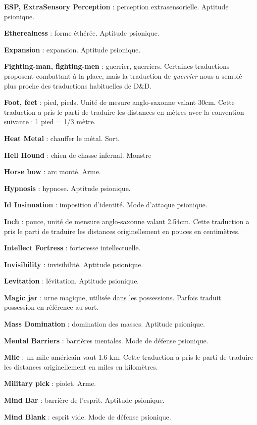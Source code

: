 \documentclass[11pt]{article}
\begin{document}
{\textbf{ESP, ExtraSensory Perception} : perception extrasensorielle. Aptitude psionique.

\textbf{Etherealness} : forme éthérée. Aptitude psionique.

\textbf{Expansion} : expansion. Aptitude psionique.

\textbf{Fighting-man, fighting-men} : guerrier, guerriers. Certaines traductions proposent \og combattant \fg{} à la place, mais la traduction de \textit{guerrier} nous a semblé plus proche des traductions habituelles de D\&D.

\textbf{Foot, feet} : pied, pieds. Unité de mesure anglo-saxonne valant 30cm. Cette traduction a pris le parti de traduire les distances en mètres avec la convention suivante : 1 pied = 1/3 mètre.

\textbf{Heat Metal} : chauffer le métal. Sort.

\textbf{Hell Hound} : chien de chasse infernal. Monstre

\textbf{Horse bow} : arc monté. Arme.

\textbf{Hypnosis} : hypnose. Aptitude psionique.

\textbf{Id Insinuation} : imposition d'identité. Mode d'attaque psionique.

\textbf{Inch} : pouce, unité de mensure anglo-saxonne valant 2.54cm. Cette traduction a pris le parti de traduire les distances originellement en pouces en centimètres.

\textbf{Intellect Fortress} : forteresse intellectuelle.

\textbf{Invisibility} : invisibilité. Aptitude psionique.

\textbf{Levitation} : lévitation. Aptitude psionique.

\textbf{Magic jar} : urne magique, utilisée dans les possessions. Parfois traduit possession en référence au sort.

\textbf{Mass Domination} : domination des masses. Aptitude psionique.

\textbf{Mental Barriers} : barrières mentales. Mode de défense psionique.

\textbf{Mile} : un mile américain vaut 1.6 km. Cette traduction a pris le parti de traduire les distances originellement en miles en kilomètres.

\textbf{Military pick} : piolet. Arme.

\textbf{Mind Bar} : barrière de l'esprit. Aptitude psionique.

\textbf{Mind Blank} : esprit vide. Mode de défense psionique.

}
\end{document}
